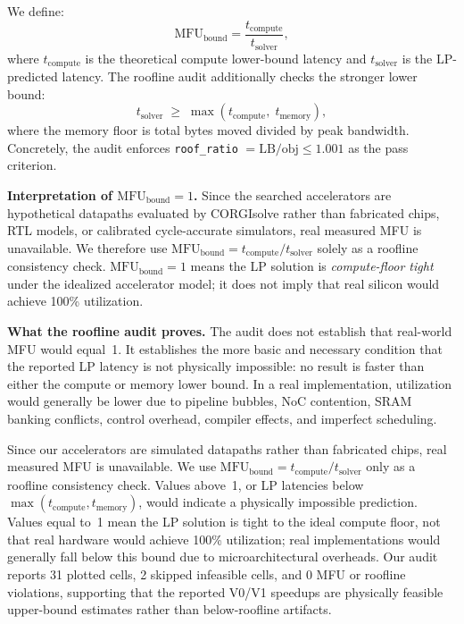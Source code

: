 \noindent We define:
\begin{equation}
    \mathrm{MFU}_{\mathrm{bound}}
    = \frac{t_{\mathrm{compute}}}{t_{\mathrm{solver}}},
    \label{eq:mfu_bound}
\end{equation}
where $t_{\mathrm{compute}}$ is the theoretical compute lower-bound
latency and $t_{\mathrm{solver}}$ is the LP-predicted latency.
The roofline audit additionally checks the stronger lower bound:
\begin{equation}
    t_{\mathrm{solver}}
    \;\geq\;
    \max\!\left(t_{\mathrm{compute}},\; t_{\mathrm{memory}}\right),
    \label{eq:roofline_lb}
\end{equation}
where the memory floor is total bytes moved divided by peak bandwidth.
Concretely, the audit enforces \texttt{roof\_ratio} $= \mathrm{LB} /
\mathrm{obj} \leq 1.001$ as the pass criterion.

\noindent\textbf{Interpretation of $\mathrm{MFU}_{\mathrm{bound}} = 1$.}
Since the searched accelerators are hypothetical datapaths evaluated by
CORGIsolve rather than fabricated chips, RTL models, or calibrated
cycle-accurate simulators, real measured MFU is unavailable.
We therefore use $\mathrm{MFU}_{\mathrm{bound}} = t_{\mathrm{compute}} /
t_{\mathrm{solver}}$ solely as a roofline consistency check.
$\mathrm{MFU}_{\mathrm{bound}} = 1$ means the LP solution is
\emph{compute-floor tight} under the idealized accelerator model; it does
not imply that real silicon would achieve 100\% utilization.

\noindent\textbf{What the roofline audit proves.}
The audit does not establish that real-world MFU would equal~1.
It establishes the more basic and necessary condition that the reported
LP latency is not physically impossible: no result is faster than either
the compute or memory lower bound.
In a real implementation, utilization would generally be lower due to
pipeline bubbles, NoC contention, SRAM banking conflicts, control
overhead, compiler effects, and imperfect scheduling.

Since our accelerators are simulated datapaths rather than fabricated
chips, real measured MFU is unavailable. We use
$\mathrm{MFU}_{\mathrm{bound}} = t_{\mathrm{compute}} /
t_{\mathrm{solver}}$ only as a roofline consistency check. Values above~1,
or LP latencies below $\max(t_{\mathrm{compute}}, t_{\mathrm{memory}})$,
would indicate a physically impossible prediction. Values equal to~1 mean
the LP solution is tight to the ideal compute floor, not that real
hardware would achieve 100\% utilization; real implementations would
generally fall below this bound due to microarchitectural overheads.
Our audit reports 31 plotted cells, 2 skipped infeasible cells, and
0 MFU or roofline violations, supporting that the reported V0/V1 speedups
are physically feasible upper-bound estimates rather than
below-roofline artifacts.



